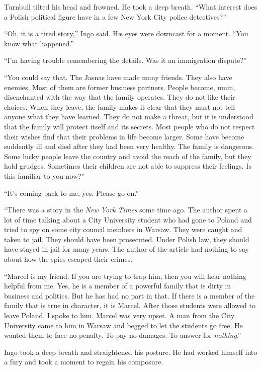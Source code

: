 \documentclass[12pt]{book}
\begin{document}
Turnbull tilted his head and frowned.  He took a deep breath.  ``What interest does a Polish political figure have in a few New York City police detectives?''

``Oh, it is a tired story,'' Ingo said.  His eyes were downcast for a moment.  ``You know what happened.''

``I'm having trouble remembering the details.  Was it an immigration dispute?''

``You could say that.  The Jasnas have made many friends.  They also have enemies.  Most of them are former business partners.  People become, umm, disenchanted with the way that the family operates.  They do not like their choices.  When they leave, the family makes it clear that they must not tell anyone what they have learned.  They do not make a threat, but it is understood that the family will protect itself and its secrets.  Most people who do not respect their wishes find that their problems in life become larger.  Some have become suddently ill and died after they had been very healthy.  The family is dangerous.  Some lucky people leave the country and avoid the reach of the family, but they hold grudges.  Sometimes their children are not able to suppress their feelings.  Is this familiar to you now?''

``It's coming back to me, yes.  Please go on.''

``There was a story in the \emph{New York Times} some time ago.  The author spent a lot of time talking about a City University student who had gone to Poland and tried to spy on some city council members in Warsaw.  They were caught and taken to jail.  They should have been prosecuted.  Under Polish law, they should have stayed in jail for many years.  The author of the article had nothing to say about how the spies escaped their crimes.

``Marcel is my friend.  If you are trying to trap him, then you will hear nothing helpful from me.  Yes, he is a member of a powerful family that is dirty in business and politics.  But he has had no part in that.  If there is a member of the family that is true in character, it is Marcel.  After those students were allowed to leave Poland, I spoke to him.  Marcel was very upset.  A man from the City University came to him in Warsaw and begged to let the students go free.  He wanted them to face no penalty.  To pay no damages.  To answer for \emph{nothing}.''

Ingo took a deep breath and straightened his posture.  He had worked himself into a fury and took a moment to regain his composure.
\end{document}
